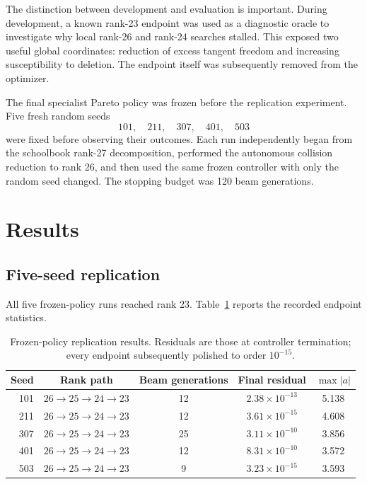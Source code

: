 \documentclass[11pt]{article}
\begin{document}
The distinction between development and evaluation is important.  During development, a known rank-23 endpoint was used as a diagnostic oracle to investigate why local rank-26 and rank-24 searches stalled.  This exposed two useful global coordinates: reduction of excess tangent freedom and increasing susceptibility to deletion.  The endpoint itself was subsequently removed from the optimizer.

The final specialist Pareto policy was frozen before the replication experiment.  Five fresh random seeds
\begin{equation}
101,\quad211,\quad307,\quad401,\quad503
\end{equation}
were fixed before observing their outcomes.  Each run independently began from the schoolbook rank-27 decomposition, performed the autonomous collision reduction to rank 26, and then used the same frozen controller with only the random seed changed.  The stopping budget was 120 beam generations.

\section{Results}

\subsection{Five-seed replication}

All five frozen-policy runs reached rank 23.  Table~\ref{tab:replication} reports the recorded endpoint statistics.

\begin{table}[ht]
\centering
\caption{Frozen-policy replication results.  Residuals are those at controller termination; every endpoint subsequently polished to order $10^{-15}$.}
\label{tab:replication}
\begin{tabular}{rcccc}
\toprule
Seed & Rank path & Beam generations & Final residual & $\max|a|$ \\
\midrule
101 & $26\to25\to24\to23$ & 12 & $2.38\times10^{-13}$ & 5.138 \\
211 & $26\to25\to24\to23$ & 12 & $3.61\times10^{-15}$ & 4.608 \\
307 & $26\to25\to24\to23$ & 25 & $3.11\times10^{-10}$ & 3.856 \\
401 & $26\to25\to24\to23$ & 12 & $8.31\times10^{-10}$ & 3.572 \\
503 & $26\to25\to24\to23$ &  9 & $3.23\times10^{-15}$ & 3.593 \\
\bottomrule
\end{tabular}
\end{table}
\end{document}
